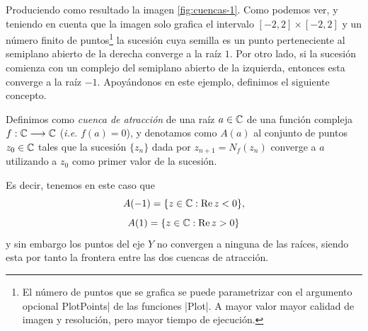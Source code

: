 Produciendo como resultado la imagen \ref{fig:cuencas-1}. Como podemos ver, y teniendo en cuenta que la imagen solo grafica el intervalo $[-2,2]\times[-2,2]$ y un número finito de puntos\footnote{El número de puntos que se grafica se puede parametrizar con el argumento opcional PlotPoints| de las funciones |Plot|. A mayor valor mayor calidad de imagen y resolución, pero mayor tiempo de ejecución.} la sucesión cuya semilla es un punto perteneciente al semiplano abierto de la derecha converge a la raíz $1$. Por otro lado, si la sucesión comienza con un complejo del semiplano abierto de la izquierda, entonces esta converge a la raíz $-1$. Apoyándonos en este ejemplo, definimos el siguiente concepto.

\begin{definicion}
    Definimos como \textit{cuenca de atracción} de una raíz $a\in\mathbb{C}$ de una función compleja $f:\mathbb{C}\longrightarrow\mathbb{C}$ (\textit{i.e.} $f(a)=0$), y denotamos como $A(a)$ al conjunto de puntos $z_0\in\mathbb{C}$ tales que la sucesión $\{z_n\}$ dada por $z_{n+1}=N_f(z_n)$ converge a $a$ utilizando a $z_0$ como primer valor de la sucesión. 
\end{definicion}

Es decir, tenemos en este caso que
$$
A(-1)=\{z\in\mathbb{C}:\operatorname{Re}z<0\},
$$
$$
A(1)=\{z\in\mathbb{C}:\operatorname{Re} z>0\}
$$
y sin embargo los puntos del eje $Y$ no convergen a ninguna de las raíces, siendo esta por tanto la frontera entre las dos cuencas de atracción. 


